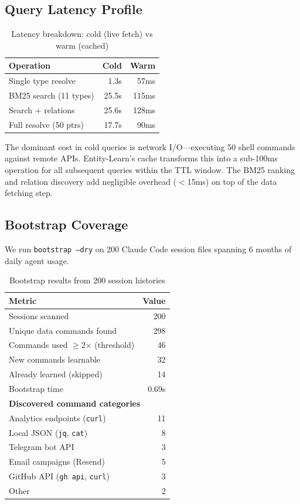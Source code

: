 \documentclass[11pt,twocolumn]{article}
\begin{document}
\subsection{Query Latency Profile}

\begin{table}[t]
\centering
\caption{Latency breakdown: cold (live fetch) vs warm (cached)}
\label{tab:latency}
\begin{tabular}{lrr}
\toprule
\textbf{Operation} & \textbf{Cold} & \textbf{Warm} \\
\midrule
Single type resolve & 1.3s & 57ms \\
BM25 search (11 types) & 25.5s & 115ms \\
Search + relations & 25.6s & 128ms \\
Full resolve (50 ptrs) & 17.7s & 90ms \\
\bottomrule
\end{tabular}
\end{table}

The dominant cost in cold queries is network I/O---executing 50 shell commands against remote APIs. Entity-Learn's cache transforms this into a sub-100ms operation for all subsequent queries within the TTL window. The BM25 ranking and relation discovery add negligible overhead ($<$15ms) on top of the data fetching step.

\subsection{Bootstrap Coverage}

We run \texttt{bootstrap --dry} on 200 Claude Code session files spanning 6 months of daily agent usage.

\begin{table}[t]
\centering
\caption{Bootstrap results from 200 session histories}
\label{tab:bootstrap}
\begin{tabular}{lr}
\toprule
\textbf{Metric} & \textbf{Value} \\
\midrule
Sessions scanned & 200 \\
Unique data commands found & 298 \\
Commands used $\geq$2$\times$ (threshold) & 46 \\
New commands learnable & 32 \\
Already learned (skipped) & 14 \\
Bootstrap time & 0.69s \\
\midrule
\multicolumn{2}{l}{\textbf{Discovered command categories}} \\
\quad Analytics endpoints (\texttt{curl}) & 11 \\
\quad Local JSON (\texttt{jq}, \texttt{cat}) & 8 \\
\quad Telegram bot API & 3 \\
\quad Email campaigns (Resend) & 5 \\
\quad GitHub API (\texttt{gh api}, \texttt{curl}) & 3 \\
\quad Other & 2 \\
\bottomrule
\end{tabular}
\end{table}
\end{document}
